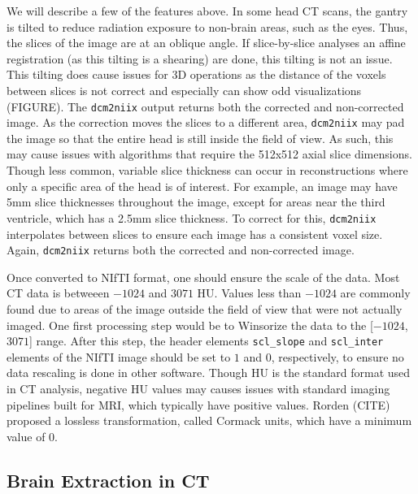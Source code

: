 \documentclass[]{elsarticle} %
\begin{document}
We will describe a few of the features above. In some head CT scans, the
gantry is tilted to reduce radiation exposure to non-brain areas, such
as the eyes. Thus, the slices of the image are at an oblique angle. If
slice-by-slice analyses an affine registration (as this tilting is a
shearing) are done, this tilting is not an issue. This tilting does
cause issues for 3D operations as the distance of the voxels between
slices is not correct and especially can show odd visualizations
(FIGURE). The \texttt{dcm2niix} output returns both the corrected and
non-corrected image. As the correction moves the slices to a different
area, \texttt{dcm2niix} may pad the image so that the entire head is
still inside the field of view. As such, this may cause issues with
algorithms that require the 512x512 axial slice dimensions. Though less
common, variable slice thickness can occur in reconstructions where only
a specific area of the head is of interest. For example, an image may
have 5mm slice thicknesses throughout the image, except for areas near
the third ventricle, which has a 2.5mm slice thickness. To correct for
this, \texttt{dcm2niix} interpolates between slices to ensure each image
has a consistent voxel size. Again, \texttt{dcm2niix} returns both the
corrected and non-corrected image.

Once converted to NIfTI format, one should ensure the scale of the data.
Most CT data is betweeen \(-1024\) and \(3071\) HU. Values less than
\(-1024\) are commonly found due to areas of the image outside the field
of view that were not actually imaged. One first processing step would
be to Winsorize the data to the {[}\(-1024\), \(3071\){]} range. After
this step, the header elements \texttt{scl\_slope} and
\texttt{scl\_inter} elements of the NIfTI image should be set to \(1\)
and \(0\), respectively, to ensure no data rescaling is done in other
software. Though HU is the standard format used in CT analysis, negative
HU values may causes issues with standard imaging pipelines built for
MRI, which typically have positive values. Rorden (CITE) proposed a
lossless transformation, called Cormack units, which have a minimum
value of \(0\).

\hypertarget{brain-extraction-in-ct}{%
\subsection{Brain Extraction in CT}\label{brain-extraction-in-ct}}
\end{document}
